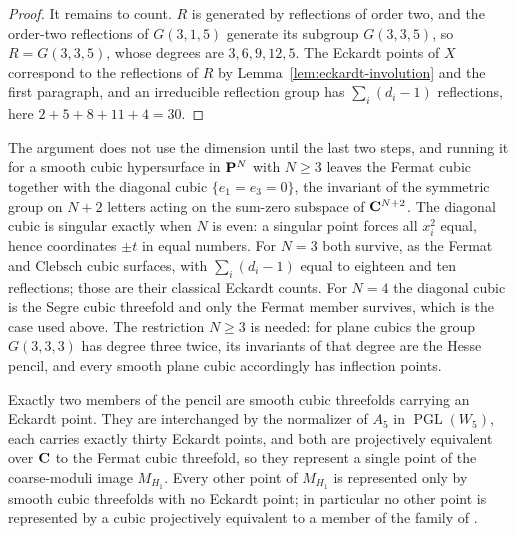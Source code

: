 \begin{proof}
It remains to count.  \(R\) is generated by reflections of order two, and the
order-two reflections of \(G(3,1,5)\) generate its subgroup \(G(3,3,5)\), so
\(R=G(3,3,5)\), whose degrees are \(3,6,9,12,5\).  The Eckardt points of \(X\)
correspond to the reflections of \(R\) by Lemma~\ref{lem:eckardt-involution}
and the first paragraph, and an irreducible reflection group has
\(\sum_i(d_i-1)\) reflections, here \(2+5+8+11+4=30\).
\end{proof}

\begin{remark}
\label{rem:eckardt-reflection-other-dimensions}
The argument does not use the dimension until the last two steps, and running
it for a smooth cubic hypersurface in \(\mathbf P^N\) with \(N\ge3\) leaves the
Fermat cubic together with the diagonal cubic \(\{e_1=e_3=0\}\), the invariant
of the symmetric group on \(N+2\) letters acting on the sum-zero subspace of
\(\mathbf C^{N+2}\).  The diagonal cubic is singular exactly when \(N\) is even: a
singular point forces all \(x_i^2\) equal, hence coordinates \(\pm t\) in equal
numbers.  For \(N=3\) both survive, as the Fermat and Clebsch cubic surfaces,
with \(\sum_i(d_i-1)\) equal to eighteen and ten reflections; those are their
classical Eckardt counts.  For \(N=4\) the diagonal cubic is the Segre cubic
threefold and only the Fermat member survives, which is the case used above.
The restriction \(N\ge3\) is needed: for plane cubics the group \(G(3,3,3)\)
has degree three twice, its invariants of that degree are the Hesse pencil, and
every smooth plane cubic accordingly has inflection points.
\end{remark}

\begin{proposition}
\label{prop:A5-not-coprime}
%
%
%
Exactly two members of the pencil are smooth cubic threefolds carrying an
Eckardt point.  They are interchanged by the normalizer of \(A_5\) in
\(\operatorname{PGL}(W_5)\), each carries exactly thirty Eckardt points, and
both are projectively equivalent over \(\mathbf C\) to the Fermat cubic threefold, so
they represent a single
point of the coarse-moduli image \(M_{H_1}\).  Every other point of \(M_{H_1}\)
is represented only by smooth cubic threefolds with no Eckardt point; in
particular no other point is represented by a cubic projectively equivalent to a
member of the family of \cite[Theorem~3.3]{YYZ}.
\end{proposition}

